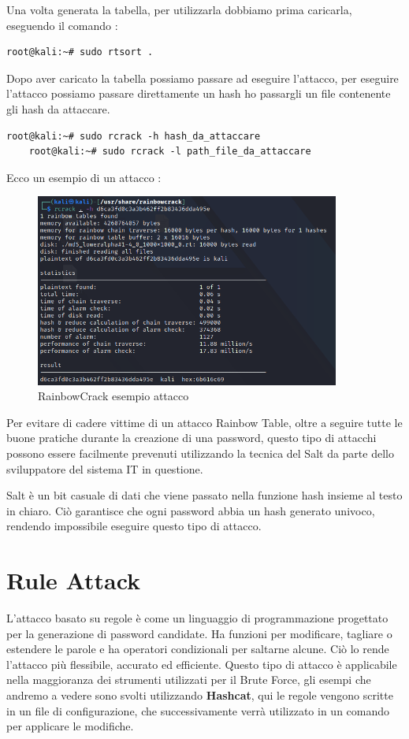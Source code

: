 Una volta generata la tabella, per utilizzarla dobbiamo prima caricarla, eseguendo il comando : 

\begin{lstlisting}[caption={RainbowCrack generazione tabelle}, style=javaScriptCode]
    root@kali:~# sudo rtsort .
    \end{lstlisting}

Dopo aver caricato la tabella possiamo passare ad eseguire l'attacco, per eseguire l'attacco possiamo passare direttamente un hash ho passargli un file contenente gli hash da attaccare.

\begin{lstlisting}[caption={RainbowCrack generazione tabelle}, style=javaScriptCode]
    root@kali:~# sudo rcrack -h hash_da_attaccare
    root@kali:~# sudo rcrack -l path_file_da_attaccare
    \end{lstlisting}
\newpage
Ecco un esempio di un attacco :

\begin{figure}[h!]
    \centering
    \includegraphics[width=100mm]{Immagini/1/r_2.png}
    \caption{RainbowCrack esempio attacco}
\end{figure}

Per evitare di cadere vittime di un attacco Rainbow Table, oltre a seguire tutte le buone pratiche durante la creazione di una password, questo tipo di attacchi possono essere facilmente prevenuti utilizzando la tecnica del Salt da parte dello sviluppatore del sistema IT in questione. 

Salt è un bit casuale di dati che viene passato nella funzione hash insieme al testo in chiaro. Ciò garantisce che ogni password abbia un hash generato univoco, rendendo impossibile eseguire questo tipo di attacco.

\section{Rule Attack}
L'attacco basato su regole\cite{Rule_based} è come un linguaggio di programmazione progettato per la generazione di password candidate. Ha funzioni per modificare, tagliare o estendere le parole e ha operatori condizionali per saltarne alcune. Ciò lo rende l'attacco più flessibile, accurato ed efficiente.
Questo tipo di attacco è applicabile nella maggioranza dei strumenti utilizzati per il Brute Force, gli esempi che andremo a vedere sono svolti utilizzando \textbf{Hashcat}, qui le regole vengono scritte in un file di configurazione, che successivamente verrà utilizzato in un comando per applicare le modifiche.

